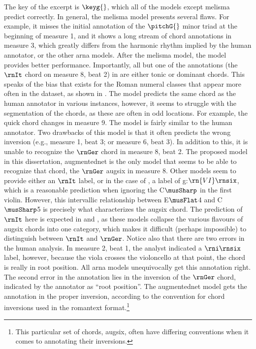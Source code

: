 The key of the excerpt is $\keyg{}$, which all of the models
except \gls{melisma} predict correctly. In general, the
\gls{melisma} model presents several flaws. For example, it
misses the initial annotation of the $\pitchG{}$ minor triad
at the beginning of measure 1, and it shows a long stream of
chord annotations in measure 3, which greatly differs from
the harmonic rhythm implied by the human annotator, or the
other \gls{arna} models. After the \gls{melisma} model, the
\textcite{chen2021attend} model provides better performance.
Importantly, all but one of the annotations (the $\rnIt$
chord on measure 8, beat 2) in \textcite{chen2021attend} are
either tonic or dominant chords. This speaks of the bias
that exists for the Roman numeral classes that appear more
often in the dataset, as shown in . The
\textcite{micchi2021deep} model predicts the same chord as
the human annotator in various instances, however, it seems
to struggle with the segmentation of the chords, as these
are often in odd locations. For example, the quick chord
changes in measure 9. The \textcite{mcleod2021modular} model
is fairly similar to the human annotator. Two drawbacks of
this model is that it often predicts the wrong inversion
(e.g., measure 1, beat 3; or measure 6, beat 3). In addition
to this, it is unable to recognize the $\rnGer$ chord in
measure 8, beat 2. The proposed model in this dissertation,
\gls{augmentednet} is the only model that seems to be able
to recognize that chord, the $\rnGer$ \gls{augsix} in
measure 8. Other models seem to provide either an $\rnIt$
label, or in the case of \textcite{mcleod2021modular}, a
label of g:$\rn{VI}\rnsix$, which is a reasonable prediction
when ignoring the C$\musSharp$ in the first violin. However,
this intervallic relationship between E$\musFlat$4 and
C$\musSharp$5 is precisely what characterizes the
\gls{augsix} chord. The prediction of $\rnIt$ here is
expected in \textcite{chen2021attend} and
\textcite{micchi2021deep}, as these models collapse the
various flavours of \gls{augsix} chords into one category,
which makes it difficult (perhaps impossible) to distinguish
between $\rnIt$ and $\rnGer$. Notice also that there are two
errors in the human analysis. In measure 2, beat 1, the
analyst indicated a $\rni\rnsix$ label, however, because the
viola crosses the violoncello at that point, the chord is
really in root position. All \gls{arna} models unequivocally
get this annotation right. The second error in the
annotation lies in the inversion of the $\rnGer$ chord,
indicated by the annotator as ``root position''. The
\gls{augmentednet} model gets the annotation in the proper
inversion, according to the convention for chord inversions
used in the \gls{romantext} format.\footnote{This particular
set of chords, \gls{augsix}, often have differing
conventions when it comes to annotating their inversions. }

